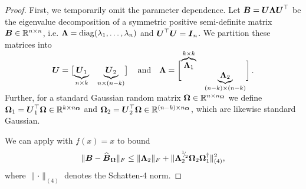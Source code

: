 \documentclass[12pt]{article}
\begin{document}
\begin{proof}
    First, we temporarily omit the parameter dependence. Let $\boldsymbol{B} = \boldsymbol{U} \boldsymbol{\Lambda} \boldsymbol{U}^{\top}$ be the eigenvalue decomposition of a symmetric positive semi-definite matrix $\boldsymbol{B} \in \mathbb{R}^{n \times n}$, i.e. $\boldsymbol{\Lambda} = \operatorname{diag}(\lambda_1, \dots, \lambda_n)$ and $\boldsymbol{U}^{\top} \boldsymbol{U}= \boldsymbol{I}_n$. We partition these matrices into
    \begin{equation}
        \rule[\dimexpr-2ex-\ht\strutbox]{0pt}{\dimexpr2ex+4ex+\baselineskip}
        \mtx{U} = \begin{bmatrix}
            \smash{\underbrace{\mtx{U}_1}_{n \times k}} & \smash{\underbrace{\mtx{U}_2}_{n \times (n-k)}}
        \end{bmatrix}
        \quad \text{and} \quad
        \mtx{\Lambda} =
        \begin{bmatrix}
            \smash{\overbrace{\mtx{\Lambda}_1}^{k \times k}} & \\ & \smash{\underbrace{\mtx{\Lambda}_2}_{(n-k) \times (n-k)}}
        \end{bmatrix}.
    \end{equation}
    Further, for a standard Gaussian random matrix $\boldsymbol{\Omega} \in \mathbb{R}^{n \times n_{\boldsymbol{\Omega}}}$ we define $\boldsymbol{\Omega}_1 = \boldsymbol{U}_1^{\top} \boldsymbol{\Omega} \in \mathbb{R}^{k \times n_{\boldsymbol{\Omega}}}$ and $\boldsymbol{\Omega}_2 = \boldsymbol{U}_2^{\top} \boldsymbol{\Omega} \in \mathbb{R}^{(n - k) \times n_{\boldsymbol{\Omega}}}$, which are likewise standard Gaussian.

    We can apply \cite[theorem B.1]{persson-2023-randomized-lowrank} with $f(x) = x$ to bound
    \begin{equation}
        \lVert \boldsymbol{B} - \widehat{\boldsymbol{B}}_{\boldsymbol{\Omega}} \rVert _F 
        \leq  \lVert \boldsymbol{\Lambda}_2 \rVert _F + \lVert \boldsymbol{\Lambda}_2^{{}^{1}{\mskip -5mu/\mskip -3mu}_{2}} \boldsymbol{\Omega}_2 \boldsymbol{\Omega}_1^{\dagger} \rVert _{(4)}^2,
        \label{equ:nystrom-proof-persson-bonud}
    \end{equation}
    where $\lVert \cdot \rVert _{(4)}$ denotes the Schatten-4 norm.
    

\end{proof}
\end{document}
